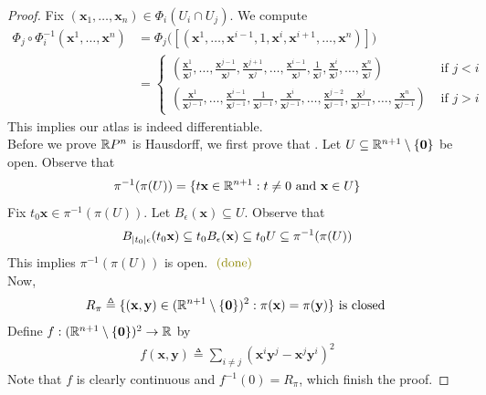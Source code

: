 \documentclass{report}
\begin{document}
\begin{proof}
Fix $(\textbf{x}_1,\dots ,\textbf{x}_{n})\in \Phi_i(U_i\cap U_j)$. We compute 
\begin{align*}
\Phi_j\circ \Phi_i^{-1} (\textbf{x}^1,\dots ,\textbf{x}^{n} )&=\Phi_j \Big( [(\textbf{x}^1,\dots ,\textbf{x}^{i-1},1,\textbf{x}^i,\textbf{x}^{i+1},\dots, \textbf{x}^n)] \Big) \\
&= \begin{cases}
  (\frac{\textbf{x}^1}{\textbf{x}^j},\dots , \frac{\textbf{x}^{j-1}}{\textbf{x}^j},\frac{\textbf{x}^{j+1}}{\textbf{x}^j},\dots ,\frac{\textbf{x}^{i-1}}{\textbf{x}^j},\frac{1}{\textbf{x}^j},\frac{\textbf{x}^i}{\textbf{x}^j},\dots ,\frac{\textbf{x}^n}{\textbf{x}^j})& \text{ if $j<i$ }\\
  (\frac{\textbf{x}^1}{\textbf{x}^{j-1}},\dots , \frac{\textbf{x}^{i-1}}{\textbf{x}^{j-1}},\frac{1}{\textbf{x}^{j-1}},\frac{\textbf{x}^i}{\textbf{x}^{j-1}},\dots , \frac{\textbf{x}^{j-2}}{\textbf{x}^{j-1}}, \frac{\textbf{x}^j}{\textbf{x}^{j-1}}, \dots,\frac{\textbf{x}^n}{\textbf{x}^{j-1}})& \text{ if $j>i$ }
\end{cases}
\end{align*}
This implies our atlas is indeed differentiable. \\

Before we prove $\mathbb{R} P^n$ is Hausdorff, we first prove that  . Let $U\subseteq \mathbb{R}^{n+1}\setminus \{ \textbf{0} \}$ be open. Observe that 
\begin{align*}
\pi^{-1}(\pi(U))= \{ t\textbf{x}\in\mathbb{R}^{n+1}:t\neq 0\text{ and }\textbf{x}\in U \}
\end{align*}
Fix $t_0\textbf{x}\in \pi^{-1}(\pi (U))$. Let $B_\epsilon (\textbf{x})\subseteq U$. Observe that
\begin{align*}
B_{\left|t_0\right|\epsilon }(t_0\textbf{x})\subseteq t_0B_\epsilon (\textbf{x})\subseteq t_0U\subseteq \pi^{-1}(\pi (U))
\end{align*}
This implies $\pi ^{-1}(\pi (U))$ is open.  $\odone$ \\

Now, 
 \begin{align*}
R_\pi \triangleq \{ (\textbf{x},\textbf{y})\in (\mathbb{R}^{n+1}\setminus \{ \textbf{0} \})^2:\pi (\textbf{x})= \pi (\textbf{y}) \}\text{ is closed }
\end{align*}
Define $f:(\mathbb{R}^{n+1}\setminus \{ \textbf{0} \})^2\rightarrow \mathbb{R}$ by 
\begin{align*}
f(\textbf{x},\textbf{y})\triangleq \sum_{i\neq j} (\textbf{x}^i\textbf{y}^j-\textbf{x}^j \textbf{y}^i)^2
\end{align*}
Note that $f$ is clearly continuous and $f^{-1}(0)=R_\pi$, which finish the proof.
\end{proof}
\end{document}
